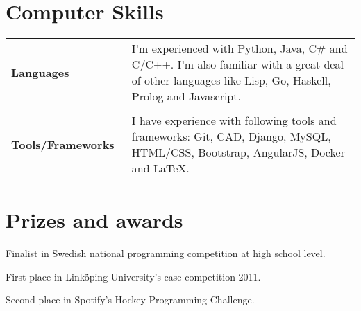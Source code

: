 \documentclass[a4paper,10pt]{article} %
\begin{document}
\section{Computer Skills}
\begin{tabular}{lp{13cm}}
\textbf{Languages} & \small{I'm experienced with Python, Java, C\# and C/C++. I'm also familiar with a great deal of other languages like Lisp, Go, Haskell, Prolog and Javascript.}\\\\
\textbf{Tools/Frameworks~} & \small{I have experience with following tools and frameworks: Git, CAD, Django, MySQL, HTML/CSS, Bootstrap, AngularJS, Docker and LaTeX.}


\end{tabular}




\section{Prizes and awards}
\begin{itemize}[noitemsep,topsep=0pt,parsep=0pt,partopsep=0pt]
\small{
\item Finalist in Swedish national programming competition at high school level.
\item First place in Linköping University’s case competition 2011.
\item Second place in Spotify’s Hockey Programming Challenge.
}
\end{itemize}
\end{document}
